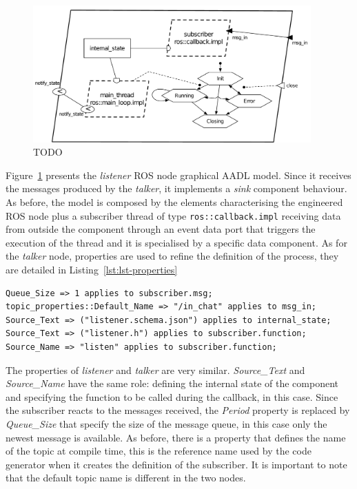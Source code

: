 \begin{figure}[t]
\centering
\includegraphics[width=0.95\textwidth]{gfx/usecase-subscriber}
\caption{TODO}\label{fig:usecase-subscriber}
\end{figure}

Figure~\ref{fig:usecase-subscriber} presents the \textit{listener} ROS node graphical AADL model. Since it receives the messages produced by the \textit{talker}, it implements a \textit{sink} component behaviour. As before, the model is composed by the elements characterising the engineered ROS node plus a subscriber thread of type \texttt{ros::callback.impl} receiving data from outside the component through an event data port that triggers the execution of the thread and it is specialised by a specific data component. As for the \textit{talker} node, properties are used to refine the definition of the process, they are detailed in Listing~\ref{lst:lst-properties}

\begin{lstlisting}[language=AADL,caption={TODO},label=lst:lst-properties]
Queue_Size => 1 applies to subscriber.msg;
topic_properties::Default_Name => "/in_chat" applies to msg_in;
Source_Text => ("listener.schema.json") applies to internal_state;
Source_Text => ("listener.h") applies to subscriber.function;
Source_Name => "listen" applies to subscriber.function;
\end{lstlisting}

The properties of \textit{listener} and \textit{talker} are very similar. \textit{Source\_Text} and \textit{Source\_Name} have the same role: defining the internal state of the component and specifying the function to be called during the callback, in this case. Since the subscriber reacts to the messages received, the \textit{Period} property is replaced by \textit{Queue\_Size} that specify the size of the message queue, in this case only the newest message is available. As before, there is a property that defines the name of the topic at compile time, this is the reference name used by the code generator when it creates the definition of the subscriber. It is important to note that the default topic name is different in the two nodes.

